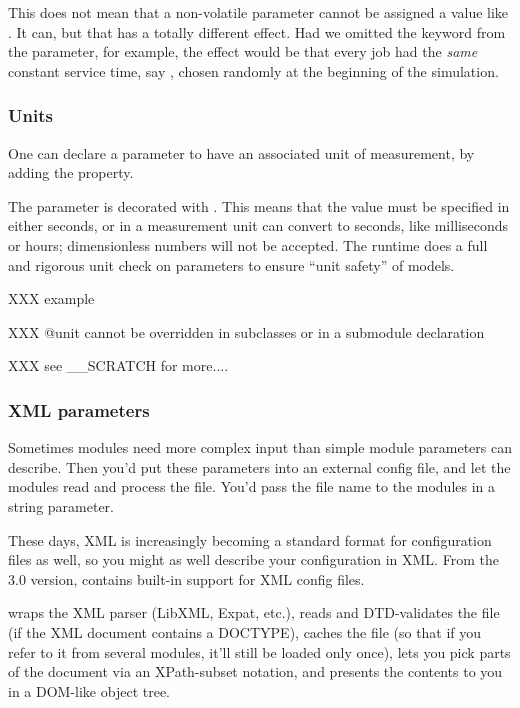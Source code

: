 \begin{note}
    This does not mean that a non-volatile parameter cannot be assigned a value
    like . It can, but that has a totally different
    effect. Had we omitted the  keyword from the
     parameter, for example, the effect would be that every
    job had the \textit{same} constant service time, say ,
    chosen randomly at the beginning of the simulation.
\end{note}

\subsubsection{Units}

One can declare a parameter to have an associated unit of measurement,
by adding the  property.

The  parameter is decorated with . This means
that the value must be specified in either seconds, or in a measurement unit {\opp}
can convert to seconds, like milliseconds or hours; dimensionless numbers
will not be accepted. The {\opp} runtime does a full and rigorous unit check on
parameters to ensure ``unit safety'' of models.

XXX example

XXX @unit cannot be overridden in subclasses or in a submodule declaration

XXX see \_\_SCRATCH for more....


\subsubsection{XML parameters}

Sometimes modules need more complex input than simple module parameters
can describe. Then you'd put these parameters into an external config file,
and let the modules read and process the file. You'd pass the file name
to the modules in a string parameter.

These days, XML is increasingly becoming a standard format for configuration
files as well, so you might as well describe your configuration in XML.
From the 3.0 version, {\opp} contains built-in support for XML config files.

{\opp} wraps the XML parser (LibXML, Expat, etc.), reads and DTD-validates
the file (if the XML document contains a DOCTYPE), caches the file
(so that if you refer to it from several modules, it'll still be loaded
only once), lets you pick parts of the document via an XPath-subset notation,
and presents the contents to you in a DOM-like object tree.

